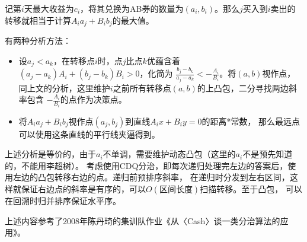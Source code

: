 记第$i$天最大收益为$c_i$，将其兑换为AB券的数量为$(a_i,b_i)$。那么$j$买入到$i$卖出的
转移就相当于计算$A_ia_j+B_ib_j$的最大值。

有两种分析方法：
\begin{itemize}
    \item 设$a_j<a_k$，在转移点$i$时，点$j$比点$k$优蕴含着
    $(a_j-a_k)A_i+(b_j-b_k)B_i>0$，化简为
    $\frac{b_j-b_k}{a_j-a_k}<-\frac{A_i}{B_i}$。将$(a,b)$视作点，
    同上文的分析，这里维护$i$之前所有转移点$(a,b)$的上凸包，二分寻找两边斜率包含
    $-\frac{A_i}{B_i}$的点作为决策点。
    \item 将$A_ia_j+B_ib_j$视作点$(a_j,b_j)$到直线$A_ix+B_iy=0$的距离*常数，
    那么最远点可以使用这条直线的平行线夹逼得到。
\end{itemize}

上述分析是等价的，由于$a_i$不单调，需要维护动态凸包（这里的$a_i$不是预先知道的，不能用李超树）。
考虑使用CDQ分治，即每次递归处理完左边的答案后，使用左边的凸包转移右边的点。递归前预排序斜率，
在递归时分发到左右区间，这样就保证右边点的斜率是有序的，可以$O(区间长度)$扫描转移。至于凸包，
可以在回溯时归并排序保证水平序。

上述内容参考了2008年陈丹琦的集训队作业《从〈Cash〉谈一类分治算法的应用》。

